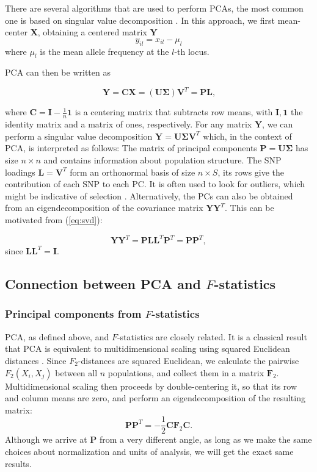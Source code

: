 \documentclass[12pt,fullpage, a4paper]{article}
\newcommand{\MX}{\mathbf{X}} %
\newcommand{\MC}{\mathbf{C}} %
\newcommand{\MY}{\mathbf{Y}} %
\newcommand{\MF}{\mathbf{F}_2} %
\newcommand{\MP}{\mathbf{P}} %
\newcommand{\ML}{\mathbf{L}} %
\newcommand{\MSINGULAR}{\mathbf{\Sigma}} %
\begin{document}
There are several algorithms that are used to perform PCAs, the most common one is based on singular value decomposition \citep[e.g.][]{jolliffe2013}. In this approach, we first mean-center $\MX$, obtaining a centered matrix $\MY$
	\begin{equation*}
	y_{il} = x_{il} - \mu_l
	\end{equation*}
	where $\mu_l$ is the mean allele frequency at the $l$-th locus.
	
	PCA can then be written as
	
	\begin{equation}
	\MY = \MC\MX = (\mathbf{U} \MSINGULAR) \mathbf{V}^T = \MP\ML\text{,} \label{eq:svd}
	\end{equation}
	
	where $\MC = \mathbf{I} -\frac{1}{n}\mathbf{1}$ is a centering matrix that subtracts row means, with $\mathbf{I}, \mathbf{1}$  the identity matrix and a matrix of ones, respectively. For any matrix $\MY$, we can perform a singular value decomposition $\MY = \mathbf{U}\MSINGULAR\mathbf{V}^T$ which, in the context of PCA, is interpreted as follows: The matrix of principal components $\MP=\mathbf{U}\MSINGULAR$ has size $n \times n$ and contains information about population structure. The SNP loadings $\ML=\mathbf{V}^T$ form an orthonormal basis of size $n \times S$, its rows give the contribution of each SNP to each PC. It is often used to look for outliers, which might be indicative of selection \citep[e.g][]{duforet-frebourg2016}. Alternatively, the PCs can also be obtained from an eigendecomposition of the covariance matrix $\MY\MY^T$. This can be motivated from (\ref{eq:svd}):
	
	\begin{equation}
	\MY\MY^T = \MP\ML\ML^T\MP^T = \MP\MP^T,
	\end{equation}
	since $\ML\ML^T=\mathbf{I}$.

\subsection{Connection between PCA and $F$-statistics}	
\subsubsection{Principal components from $F$-statistics}
PCA, as defined above, and $F$-statistics are closely related. It is a classical result that PCA is equivalent to multidimensional scaling using squared Euclidean distances \citep{gower1966}. Since $F_2$-distances are squared Euclidean, we calculate the pairwise $F_2(X_i, X_j)$ between all $n$ populations, and collect them in a matrix $\MF$. Multidimensional scaling then proceeds by double-centering it, so that its row and column means are zero, and perform an eigendecomposition of the resulting matrix:
\begin{equation}
\MP\MP^T = - \frac{1}{2}\MC\MF\MC \text{.} \label{eq:mds}
\end{equation}
Although we arrive at $\MP$ from a very different angle, as long as we make the same choices about normalization and units of analysis, we will get the exact same results.
\end{document}
